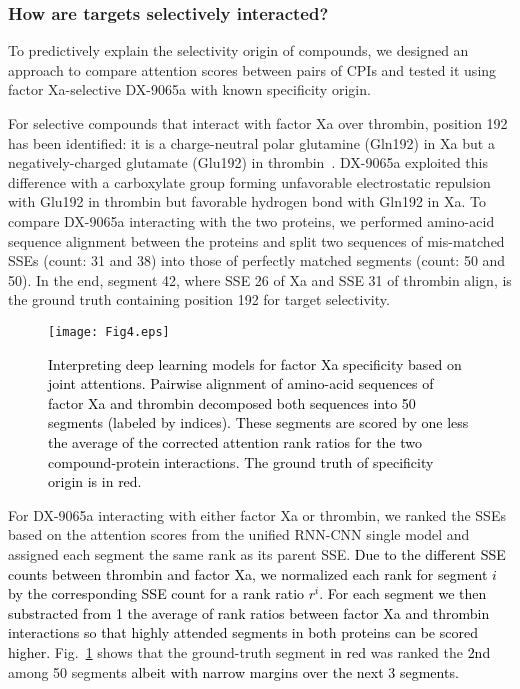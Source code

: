 \documentclass[nocrop]{bioinfo}
\newcommand{\red}[1]{\textcolor{black}{#1}}
\begin{document}
\subsubsection{How are targets selectively interacted?}
To predictively explain the selectivity origin of compounds, we designed an approach to compare attention scores between pairs of CPIs and tested it using factor Xa-selective DX-9065a with known specificity origin. 

For selective compounds that interact with factor Xa over thrombin, position 192 has been identified: it is a charge-neutral polar glutamine  (Gln192) in Xa but a negatively-charged glutamate  (Glu192) in thrombin~\citep{huggins2012rational}. DX-9065a exploited this difference with a carboxylate group forming unfavorable electrostatic repulsion with Glu192 in thrombin but favorable hydrogen bond with Gln192 in Xa.  To compare DX-9065a interacting with the two proteins, we performed amino-acid sequence alignment between the proteins and split two sequences of mis-matched SSEs  (count: 31 and 38) into those of perfectly matched segments  (count: 50 and 50). In the end, segment 42, where SSE 26 of Xa and SSE 31 of thrombin align,  is the ground truth containing position 192 for target selectivity.

\begin{figure}[!htb]
    \centering
    \texttt{[image: Fig4.eps]}
\caption{\red{Interpreting deep learning models for factor Xa specificity based on joint attentions.  Pairwise alignment of amino-acid sequences of factor Xa and thrombin decomposed both sequences into 50 segments  (labeled by indices).  These segments are scored by one less the average of the corrected attention rank ratios for the two compound-protein interactions. The ground truth of specificity origin is in red.}} \vspace{-1em}
    \label{fig:factorXa_spec}
\end{figure}

For DX-9065a interacting with either factor Xa or thrombin, we ranked the SSEs based on the attention scores from the unified RNN-CNN single model and assigned each segment the same rank as its parent SSE. \red{Due to the different SSE counts between thrombin and factor Xa, we normalized each rank for segment $i$ by the corresponding SSE count for a rank ratio $r^i$. For each segment we then substracted from 1 the average of rank ratios between factor Xa and thrombin interactions so that highly attended segments in both proteins can be scored higher.} Fig.~\ref{fig:factorXa_spec} shows that the ground-truth segment \red{in red} was ranked the \red{2nd} among 50 segments \red{albeit with narrow margins over the next 3 segments.} 
\end{document}
